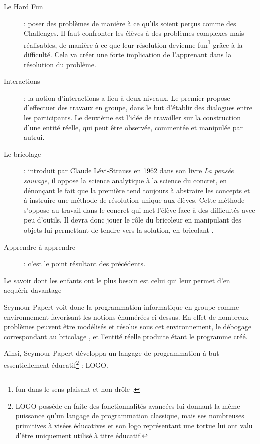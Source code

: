\begin{description}
  \item[Le \og Hard Fun \fg{}] : poser des problèmes de manière à ce qu'ils soient perçus comme des Challenges. Il faut confronter les élèves à des problèmes complexes mais réalisables, de manière à ce que leur résolution devienne \og{}fun\fg{}\footnote{\og{}fun\fg{} dans le sens \og{}plaisant\fg{} et non \og drôle \fg{}.} grâce à la difficulté. Cela va créer une forte implication de l'apprenant dans la résolution du problème.
  \item[Interactions] : la notion d'interactions a lieu à deux niveaux. Le premier propose d'effectuer des travaux en groupe, dans le but d'établir des dialogues entre les participants. Le deuxième est l'idée de travailler sur la construction d'une entité réelle, qui peut être observée, commentée et manipulée par autrui.
  \item[Le \og bricolage \fg{}] : introduit par Claude Lévi-Strauss en 1962 dans son livre \emph{La pensée sauvage}, il oppose la science analytique à la science du concret, en dénonçant le fait que la première tend toujours à abstraire les concepts et à instruire une méthode de résolution unique aux élèves. Cette méthode s'oppose au travail dans le concret qui met l'élève face à des difficultés avec peu d'outils. Il devra donc jouer le rôle du \og bricoleur \fg{} en manipulant des objets lui permettant de tendre vers la solution, en \og bricolant \fg{}.
  \item[\og Apprendre à apprendre \fg{} ] : c'est le point résultant des précédents.
\end{description}

\begin{coolquote}
    Le savoir dont les enfants ont le plus besoin est celui qui leur permet d'en acquérir davantage
\end{coolquote}

Seymour Papert voit donc la programmation informatique en groupe comme environnement favorisant les notions énumérées ci-dessus. En effet de nombreux problèmes peuvent être modélisés et résolus sous cet environnement, le débogage correspondant au \og bricolage \fg{}, et l'entité réelle produite étant le programme créé.

Ainsi, Seymour Papert développa un langage de programmation à but
essentiellement éducatif\footnote{LOGO possède en faite des
  fonctionnalités avancées lui donnant la même puissance qu'un langage
  de programmation \og{}classique\fg{}, mais ses nombreuses primitives
  à visées éducatives et son logo représentant une tortue lui ont valu
  d'être uniquement utilisé à titre éducatif.} : LOGO.

